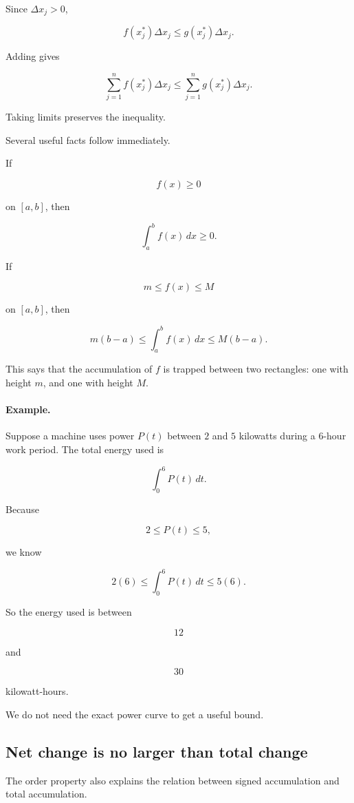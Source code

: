Since \(\Delta x_j>0\),

\[
f(x_j^*)\Delta x_j\le g(x_j^*)\Delta x_j.
\]

Adding gives

\[
\sum_{j=1}^{n} f(x_j^*)\Delta x_j
\le
\sum_{j=1}^{n} g(x_j^*)\Delta x_j.
\]

Taking limits preserves the inequality.

Several useful facts follow immediately.

If

\[
f(x)\ge0
\]

on \([a,b]\), then

\[
\boxed{
\int_a^b f(x)\,dx\ge0.
}
\]

If

\[
m\le f(x)\le M
\]

on \([a,b]\), then

\[
\boxed{
m(b-a)
\le
\int_a^b f(x)\,dx
\le
M(b-a).
}
\]

This says that the accumulation of \(f\) is trapped between two rectangles: one with
height \(m\), and one with height \(M\).

\paragraph{Example.}
Suppose a machine uses power \(P(t)\) between \(2\) and \(5\) kilowatts during a
\(6\)-hour work period.  The total energy used is

\[
\int_0^6 P(t)\,dt.
\]

Because

\[
2\le P(t)\le5,
\]

we know

\[
2(6)\le \int_0^6 P(t)\,dt\le5(6).
\]

So the energy used is between

\[
12
\]

and

\[
30
\]

kilowatt-hours.

We do not need the exact power curve to get a useful bound.

\subsection{Net change is no larger than total change}
\label{subsec:net-change-total-change-inequality}

The order property also explains the relation between signed accumulation and total
accumulation.

